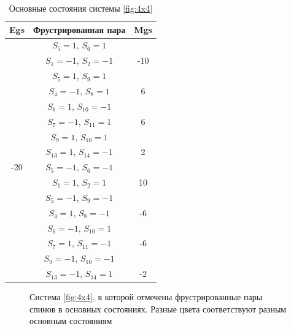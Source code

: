 \documentclass[utf8, babel, sor, jor, amsmath, amssymb, reprint]{elsarticle} %
\begin{document}
\begin{table}[H]
	\centering
	\begin{tabular}{|c|c|c|}
		\hline
		Egs   &   Фрустрированная пара & Mgs \\
		\hline
		  &  $S_5=1$, $S_6=1$& \\
		&    $S_1=-1$, $S_2=-1$ & -10\\
		\cline{2-3}
		   &  $S_5=1$, $S_9=1$& \\
		&    $S_4=-1$, $S_8=1$& 6\\
			\cline{2-3}
		  &  $S_6=1$, $S_{10}=-1$&\\
		&    $S_7=-1$, $S_{11}=1$& 6\\
		\cline{2-3}
		   &  $S_9=1$, $S_{10}=1$&\\
		&    $S_{13}=1$, $S_{14}=-1$& 2\\
		\cline{2-3}
		-20	\multirow{3}{*}{}
		  &  $S_5=-1$, $S_6=-1$&\\
		&    $S_1=1$, $S_2=1$& 10\\
		\cline{2-3}
		  &  $S_5=-1$, $S_9=-1$&\\
		&    $S_4=1$, $S_8=-1$& -6\\
		\cline{2-3}
		   &  $S_6=-1$, $S_{10}=1$&\\
		&    $S_7=1$, $S_{11}=-1$& -6\\
			\cline{2-3}
		  &  $S_9=-1$, $S_{10}=-1$&\\
		&    $S_{13}=-1$, $S_{14}=1$& -2\\
		\hline
	\end{tabular}
	\caption{Основные состояния системы \ref{fig:4x4}}
	\label{tab:gs_4x4}
\end{table}

\begin{figure}[H]
	\centering
	\caption{Система \ref{fig:4x4}, в которой отмечены фрустрированные пары спинов в основных состояниях. Разные цвета соответствуют разным основным состояниям}
	\label{fig:4x4.1}
\end{figure}
\end{document}
